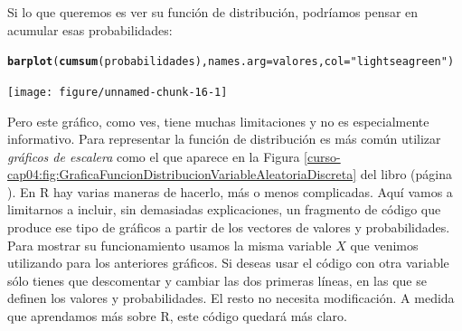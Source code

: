 \documentclass[10pt,a4paper]{article}\usepackage[]{graphicx}\usepackage[]{color}
\makeatletter
\newcommand{\hlstr}[1]{\textcolor[rgb]{0.192,0.494,0.8}{#1}}%
\newcommand{\hlstd}[1]{\textcolor[rgb]{0.345,0.345,0.345}{#1}}%
\newcommand{\hlkwc}[1]{\textcolor[rgb]{0.333,0.667,0.333}{#1}}%
\newcommand{\hlkwd}[1]{\textcolor[rgb]{0.737,0.353,0.396}{\textbf{#1}}}%
\newenvironment{kframe}{%
 \def\at@end@of@kframe{}%
 \ifinner\ifhmode%
  \def\at@end@of@kframe{\end{minipage}}%
  \begin{minipage}{\columnwidth}%
 \fi\fi%
 \def\FrameCommand##1{\hskip\@totalleftmargin \hskip-\fboxsep
 \colorbox{shadecolor}{##1}\hskip-\fboxsep
     \hskip-\linewidth \hskip-\@totalleftmargin \hskip\columnwidth}%
 \MakeFramed {\advance\hsize-\width
   \@totalleftmargin\z@ \linewidth\hsize
   \@setminipage}}%
 {\par\unskip\endMakeFramed%
 \at@end@of@kframe}
\newenvironment{knitrout}{}{} %
\makeatother
\begin{document}
Si lo que queremos es ver su función de distribución, podríamos pensar en acumular esas probabilidades:
\begin{knitrout}
\color{fgcolor}\begin{kframe}
\begin{alltt}
\hlkwd{barplot}\hlstd{(}\hlkwd{cumsum}\hlstd{(probabilidades),} \hlkwc{names.arg}\hlstd{=valores,} \hlkwc{col}\hlstd{=}\hlstr{"lightseagreen"}\hlstd{)}
\end{alltt}
\end{kframe}
\texttt{[image: figure/unnamed-chunk-16-1]} 

\end{knitrout}
Pero este gráfico, como ves,  tiene muchas limitaciones y no es especialmente informativo. Para representar la función de distribución es más común utilizar {\em gráficos de escalera} como el que aparece en la Figura \ref{curso-cap04:fig:GraficaFuncionDistribucionVariableAleatoriaDiscreta} del libro (página \pageref{curso-cap04:fig:GraficaFuncionDistribucionVariableAleatoriaDiscreta}). En R hay varias maneras de hacerlo, más o menos complicadas. Aquí vamos a limitarnos a incluir, sin demasiadas explicaciones, un fragmento de código que produce ese tipo de gráficos a partir de los vectores de valores y probabilidades. Para mostrar su funcionamiento usamos la misma variable $X$ que venimos utilizando para los anteriores gráficos. Si deseas usar el código con otra variable sólo tienes que descomentar y cambiar las dos primeras líneas, en las que se definen los valores y probabilidades. El resto no necesita modificación. A medida que aprendamos más sobre R, este código quedará más claro.
\end{document}
